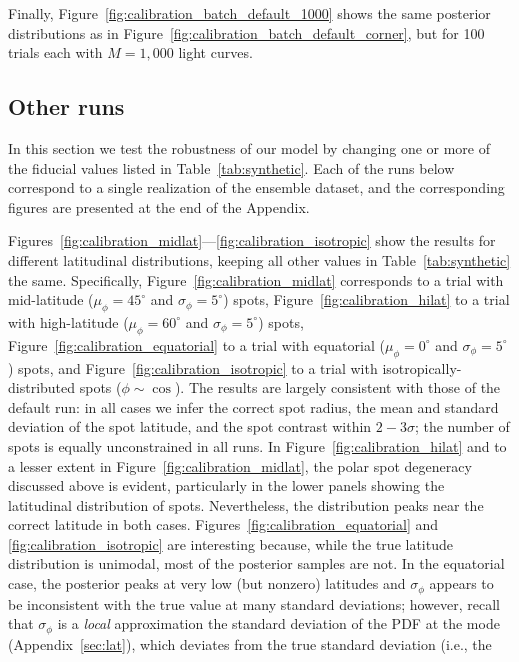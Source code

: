 \documentclass[modern]{aastex62}
\begin{document}
Finally, Figure~\ref{fig:calibration_batch_default_1000} shows
the same posterior distributions as in Figure~\ref{fig:calibration_batch_default_corner},
but for 100 trials each with $M=1{,}000$ light curves. 

\subsection{Other runs}
In this section we test the robustness of our model by changing one or
more of the fiducial values listed in Table~\ref{tab:synthetic}.
Each of the runs below correspond to a single realization of the ensemble
dataset, and the corresponding figures are presented at the end of the Appendix.

Figures~\ref{fig:calibration_midlat}---\ref{fig:calibration_isotropic}
show the results for different latitudinal
distributions, keeping all other values in Table~\ref{tab:synthetic} the same.
Specifically, Figure~\ref{fig:calibration_midlat} corresponds to a trial
with mid-latitude ($\mu_\phi = 45^\circ$ and $\sigma_\phi = 5^\circ$) spots,
Figure~\ref{fig:calibration_hilat} to a trial with high-latitude
($\mu_\phi = 60^\circ$ and $\sigma_\phi = 5^\circ$) spots,
Figure~\ref{fig:calibration_equatorial} to a trial with equatorial
($\mu_\phi = 0^\circ$ and $\sigma_\phi = 5^\circ$) spots, and
Figure~\ref{fig:calibration_isotropic} to a trial with isotropically-distributed
spots ($\phi \sim \cos$).
The results are largely consistent with those of the default run: in all
cases we infer the correct spot radius, the mean and standard deviation of
the spot latitude, and the spot contrast within $2-3\sigma$; the number of
spots is equally unconstrained in all runs.
In Figure~\ref{fig:calibration_hilat} and to a lesser extent in
Figure~\ref{fig:calibration_midlat}, the polar spot degeneracy discussed
above is evident, particularly in the lower panels showing the latitudinal
distribution of spots. Nevertheless, the distribution peaks near the correct
latitude in both cases.
Figures~\ref{fig:calibration_equatorial} and \ref{fig:calibration_isotropic}
are interesting because, while the true latitude distribution is unimodal,
most of the posterior samples are not. In the equatorial case, the posterior
peaks at very low (but nonzero) latitudes and $\sigma_\phi$ appears to be
inconsistent with the true value at many standard deviations; however, recall
that $\sigma_\phi$ is a \emph{local} approximation the standard deviation of the
PDF at the mode (Appendix~\ref{sec:lat}), which deviates from the true
standard deviation (i.e., the
\end{document}
